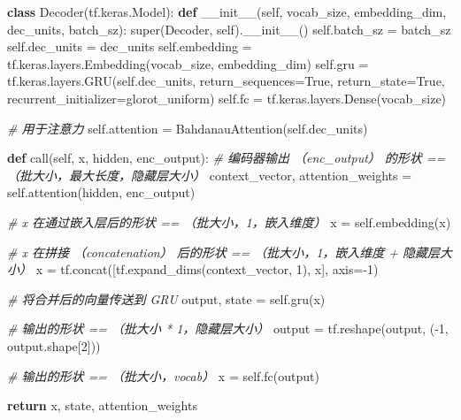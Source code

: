 \documentclass[
]{article}
\newenvironment{Shaded}{}{}
\newcommand{\BuiltInTok}[1]{#1}
\newcommand{\CommentTok}[1]{\textcolor[rgb]{0.38,0.63,0.69}{\textit{#1}}}
\newcommand{\ControlFlowTok}[1]{\textcolor[rgb]{0.00,0.44,0.13}{\textbf{#1}}}
\newcommand{\DecValTok}[1]{\textcolor[rgb]{0.25,0.63,0.44}{#1}}
\newcommand{\FunctionTok}[1]{\textcolor[rgb]{0.02,0.16,0.49}{#1}}
\newcommand{\KeywordTok}[1]{\textcolor[rgb]{0.00,0.44,0.13}{\textbf{#1}}}
\newcommand{\NormalTok}[1]{#1}
\newcommand{\OperatorTok}[1]{\textcolor[rgb]{0.40,0.40,0.40}{#1}}
\newcommand{\StringTok}[1]{\textcolor[rgb]{0.25,0.44,0.63}{#1}}
\newcommand{\VariableTok}[1]{\textcolor[rgb]{0.10,0.09,0.49}{#1}}
\begin{document}
\begin{Shaded}
\begin{Highlighting}[]

\KeywordTok{class}\NormalTok{ Decoder(tf.keras.Model):}
    \KeywordTok{def} \FunctionTok{\_\_init\_\_}\NormalTok{(}\VariableTok{self}\NormalTok{, vocab\_size, embedding\_dim, dec\_units, batch\_sz):}
        \BuiltInTok{super}\NormalTok{(Decoder, }\VariableTok{self}\NormalTok{).}\FunctionTok{\_\_init\_\_}\NormalTok{()}
        \VariableTok{self}\NormalTok{.batch\_sz }\OperatorTok{=}\NormalTok{ batch\_sz}
        \VariableTok{self}\NormalTok{.dec\_units }\OperatorTok{=}\NormalTok{ dec\_units}
        \VariableTok{self}\NormalTok{.embedding }\OperatorTok{=}\NormalTok{ tf.keras.layers.Embedding(vocab\_size, embedding\_dim)}
        \VariableTok{self}\NormalTok{.gru }\OperatorTok{=}\NormalTok{ tf.keras.layers.GRU(}\VariableTok{self}\NormalTok{.dec\_units,}
\NormalTok{                                       return\_sequences}\OperatorTok{=}\VariableTok{True}\NormalTok{,}
\NormalTok{                                       return\_state}\OperatorTok{=}\VariableTok{True}\NormalTok{,}
\NormalTok{                                       recurrent\_initializer}\OperatorTok{=}\StringTok{\textquotesingle{}glorot\_uniform\textquotesingle{}}\NormalTok{)}
        \VariableTok{self}\NormalTok{.fc }\OperatorTok{=}\NormalTok{ tf.keras.layers.Dense(vocab\_size)}

        \CommentTok{\# 用于注意力}
        \VariableTok{self}\NormalTok{.attention }\OperatorTok{=}\NormalTok{ BahdanauAttention(}\VariableTok{self}\NormalTok{.dec\_units)}

    \KeywordTok{def}\NormalTok{ call(}\VariableTok{self}\NormalTok{, x, hidden, enc\_output):}
        \CommentTok{\# 编码器输出 （enc\_output） 的形状 == （批大小，最大长度，隐藏层大小）}
\NormalTok{        context\_vector, attention\_weights }\OperatorTok{=} \VariableTok{self}\NormalTok{.attention(hidden, enc\_output)}

        \CommentTok{\# x 在通过嵌入层后的形状 == （批大小，1，嵌入维度）}
\NormalTok{        x }\OperatorTok{=} \VariableTok{self}\NormalTok{.embedding(x)}

        \CommentTok{\# x 在拼接 （concatenation） 后的形状 == （批大小，1，嵌入维度 + 隐藏层大小）}
\NormalTok{        x }\OperatorTok{=}\NormalTok{ tf.concat([tf.expand\_dims(context\_vector, }\DecValTok{1}\NormalTok{), x], axis}\OperatorTok{={-}}\DecValTok{1}\NormalTok{)}

        \CommentTok{\# 将合并后的向量传送到 GRU}
\NormalTok{        output, state }\OperatorTok{=} \VariableTok{self}\NormalTok{.gru(x)}

        \CommentTok{\# 输出的形状 == （批大小 * 1，隐藏层大小）}
\NormalTok{        output }\OperatorTok{=}\NormalTok{ tf.reshape(output, (}\OperatorTok{{-}}\DecValTok{1}\NormalTok{, output.shape[}\DecValTok{2}\NormalTok{]))}

        \CommentTok{\# 输出的形状 == （批大小，vocab）}
\NormalTok{        x }\OperatorTok{=} \VariableTok{self}\NormalTok{.fc(output)}

        \ControlFlowTok{return}\NormalTok{ x, state, attention\_weights}
\end{Highlighting}
\end{Shaded}
\end{document}
